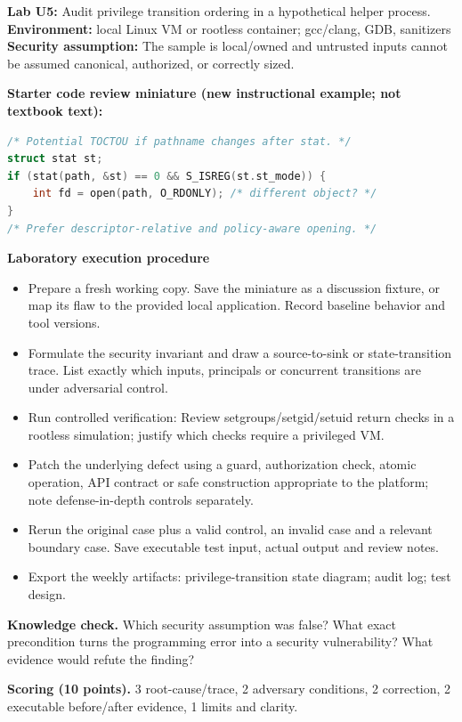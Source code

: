 \documentclass[10pt,letterpaper]{article}
\begin{document}
\begin{insight}\textbf{Lab U5:} Audit privilege transition ordering in a hypothetical helper process.\\\textbf{Environment:} local Linux VM or rootless container; gcc/clang, GDB, sanitizers\\\textbf{Security assumption:} The sample is local/owned and untrusted inputs cannot be assumed canonical, authorized, or correctly sized.\end{insight}
\textbf{Starter code review miniature (new instructional example; not textbook text):}
\begin{lstlisting}[language=C]
/* Potential TOCTOU if pathname changes after stat. */
struct stat st;
if (stat(path, &st) == 0 && S_ISREG(st.st_mode)) {
    int fd = open(path, O_RDONLY); /* different object? */
}
/* Prefer descriptor-relative and policy-aware opening. */
\end{lstlisting}
\textbf{Laboratory execution procedure}
\begin{itemize}[leftmargin=*,itemsep=2pt]
\item Prepare a fresh working copy. Save the miniature as a discussion fixture, or map its flaw to the provided local application. Record baseline behavior and tool versions.
\item Formulate the security invariant and draw a source-to-sink or state-transition trace. List exactly which inputs, principals or concurrent transitions are under adversarial control.
\item Run controlled verification: Review setgroups/setgid/setuid return checks in a rootless simulation; justify which checks require a privileged VM.
\item Patch the underlying defect using a guard, authorization check, atomic operation, API contract or safe construction appropriate to the platform; note defense-in-depth controls separately.
\item Rerun the original case plus a valid control, an invalid case and a relevant boundary case. Save executable test input, actual output and review notes.
\item Export the weekly artifacts: privilege-transition state diagram; audit log; test design.
\end{itemize}
\textbf{Knowledge check.} Which security assumption was false? What exact precondition turns the programming error into a security vulnerability? What evidence would refute the finding?

\textbf{Scoring (10 points).} 3 root-cause/trace, 2 adversary conditions, 2 correction, 2 executable before/after evidence, 1 limits and clarity.
\end{document}
